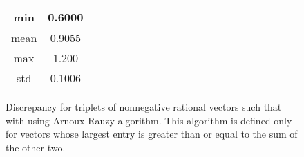 \documentclass[preliminary,copyright,creativecommons]{eptcs}
\begin{document}
\begin{center}
\begin{figure}[ht!]
\begin{minipage}[c]{0.2\linewidth}
\begin{tabular}{c|c}
min & 0.6000 \\
\hline
mean & 0.9055 \\
\hline
max & 1.200 \\
\hline
std & 0.1006 \\
\end{tabular}
 \end{minipage}
\begin{minipage}[c]{0.8\linewidth}
\end{minipage}
 \caption{Discrepancy for triplets of nonnegative rational  vectors    such that  with  using Arnoux-Rauzy algorithm. This algorithm is defined only for vectors whose largest entry is greater than or equal to the sum of the other two.}
\label{fig:AR}
\end{figure}
\end{center}
\end{document}

